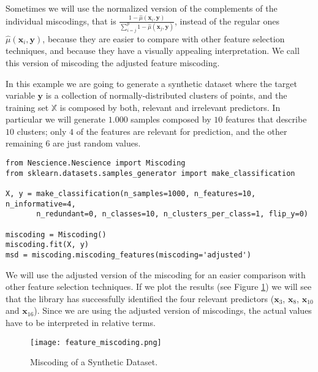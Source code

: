 Sometimes we will use the normalized version of the complements of the individual miscodings, that is $\frac{ 1 - \hat\mu(\mathbf{x}_i, \mathbf{y}) } { \sum_{i=j}^p 1 - \hat\mu(\mathbf{x}_j, \mathbf{y}) }$, instead of the regular ones $\hat\mu(\mathbf{x}_i, \mathbf{y})$, because they are easier to compare with other feature selection techniques, and because they have a visually appealing interpretation. We call this version of miscoding the adjusted feature miscoding.

\begin{example}
In this example we are going to generate a synthetic dataset where the target variable $\mathbf{y}$ is a collection of normally-distributed clusters of points, and the training set $\mathbb{X}$ is composed by both, relevant and irrelevant predictors. In particular we will generate $1.000$ samples composed by $10$ features that describe $10$ clusters; only $4$ of the features are relevant for prediction, and the other remaining $6$ are just random values.

\begin{sourcecode}
{\scriptsize \begin{verbatim}
from Nescience.Nescience import Miscoding
from sklearn.datasets.samples_generator import make_classification

X, y = make_classification(n_samples=1000, n_features=10, n_informative=4,
       n_redundant=0, n_classes=10, n_clusters_per_class=1, flip_y=0)

miscoding = Miscoding()
miscoding.fit(X, y)
msd = miscoding.miscoding_features(miscoding='adjusted')
\end{verbatim}}
\end{sourcecode}

We will use the adjusted version of the miscoding for an easier comparison with other feature selection techniques. If we plot the results (see Figure \ref{figure:miscoding_make_classification}) we will see that the library has successfully identified the four relevant predictors ($\mathbf{x}_3$, $\mathbf{x}_8$, $\mathbf{x}_{10}$ and $\mathbf{x}_{16}$). Since we are using the adjusted version of miscodings, the actual values have to be interpreted in relative terms. 

\begin{figure}[h]
\centering
\texttt{[image: feature\_miscoding.png]}
\caption{Miscoding of a Synthetic Dataset.}
\label{figure:miscoding_make_classification}
\end{figure}


\end{example}

